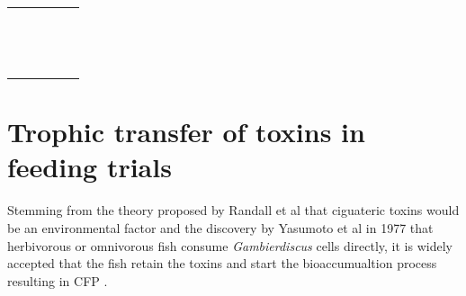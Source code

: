 \documentclass[12pt]{article}
\begin{document}
\begin{longtable}{  p{2cm} p{3cm}  p{4.5cm}  p{2cm}  p{3cm}  }
  & \emph{} &  &  & \\
  &  \emph{} &  &  & \\
  & \emph{}  &  &  & \\
  & \emph{} &  &  & \\
  &  \emph{} &  &  & \\
  & \emph{}  &  &  & \\
  & \emph{} &  &  & \\
  &  \emph{} &  &  & \\
  & \emph{}  &  &  & \\
  & \emph{} &  &  & \\
  &  \emph{} &  &  & \\
  & \emph{}  &  &  & \\
  & \emph{} &  &  & \\
\end{longtable}

\FloatBarrier

\section{Trophic transfer of toxins in feeding trials}

Stemming from the theory proposed by Randall et al that ciguateric toxins would be an environmental factor and the discovery by Yasumoto et al in 1977 that herbivorous or omnivorous fish consume \emph{Gambierdiscus} cells directly, it is widely accepted that the fish retain the toxins and start the bioaccumualtion process resulting in CFP \cite{randall1958review,yasumoto1977finding}.
\end{document}
